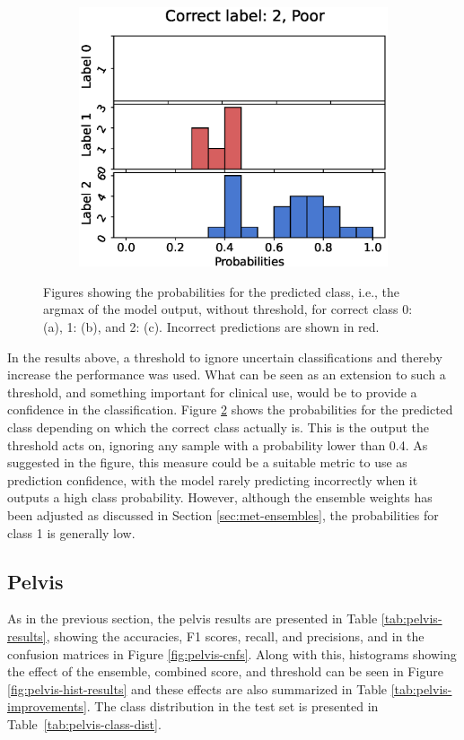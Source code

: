 \begin{figure}
  \begin{subfigure}[t]{0.33\textwidth}
    \includegraphics[width=\textwidth]{files/figs/res/trunk/pc2-rb.eps}
    \caption{}
    \label{fig:trunk-pc2}
  \end{subfigure}

  \caption{Figures showing the probabilities for the predicted class, i.e., the argmax of the model output, without threshold, for correct class 0: (a), 1: (b), and 2: (c). Incorrect predictions are shown in red.}
  \label{fig:trunk-pc}
\end{figure}

In the results above, a threshold to ignore uncertain classifications and thereby increase the performance was used. What can be seen as an extension to such a threshold, and something important for clinical use, would be to provide a confidence in the classification. Figure \ref{fig:trunk-pc} shows the probabilities for the predicted class depending on which the correct class actually is. This is the output the threshold acts on, ignoring any sample with a probability lower than 0.4. As suggested in the figure, this measure could be a suitable metric to use as prediction confidence, with the model rarely predicting incorrectly when it outputs a high class probability. However, although the ensemble weights has been adjusted as discussed in Section \ref{sec:met-ensembles}, the probabilities for class 1 is generally low.

\FloatBarrier
\subsection{Pelvis}
As in the previous section, the pelvis results are presented in Table \ref{tab:pelvis-results}, showing the accuracies, F1 scores, recall, and precisions, and in the confusion matrices in Figure \ref{fig:pelvis-cnfs}.
Along with this, histograms showing the effect of the ensemble, combined score, and threshold can be seen in Figure \ref{fig:pelvis-hist-results} and these effects are also summarized in Table \ref{tab:pelvis-improvements}. The class distribution in the test set is presented in Table~\ref{tab:pelvis-class-dist}.

